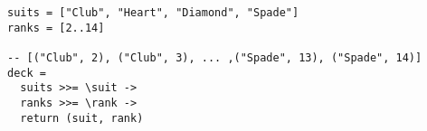\begin{algorithm}

\begin{comment}
\begin{verbatim}
name :: IO ()
name =
  putStrLn "What's your name?" >>= \_ ->
  getLine >>= \name -> 
  putStrLn ("Nice to meet you " ++ name)
\end{verbatim}
\end{comment}


\begin{verbatim}
suits = ["Club", "Heart", "Diamond", "Spade"]
ranks = [2..14]

-- [("Club", 2), ("Club", 3), ... ,("Spade", 13), ("Spade", 14)]
deck =
  suits >>= \suit ->
  ranks >>= \rank ->
  return (suit, rank)
\end{verbatim}

\caption{Monadic bind in list monad results in a cartesian product %
\label{monad:bind}}
\end{algorithm}